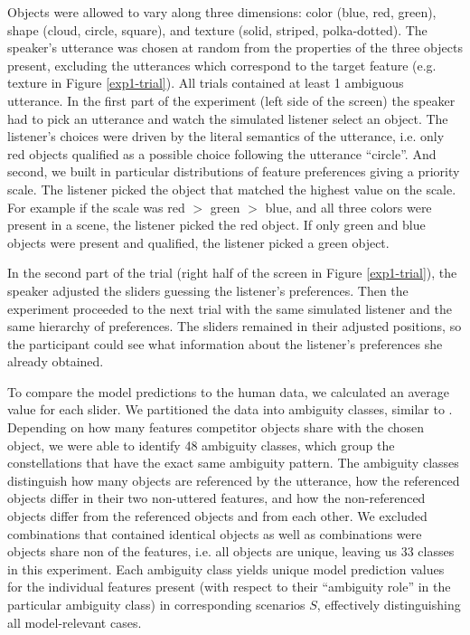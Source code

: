 \documentclass[10pt,a4paper]{article}
\begin{document}
Objects were allowed to vary along three dimensions: color (blue, red, green), shape (cloud, circle, square), and texture (solid, striped, polka-dotted). The speaker's utterance was chosen at random from the properties of the three objects present, excluding the utterances which correspond to the target feature (e.g. texture in Figure \ref{exp1-trial}).  All trials contained at least 1 ambiguous utterance. 
In the first part of the experiment (left side of the screen) the speaker had to pick an utterance and watch the simulated listener select an object. The listener's choices were driven by the literal semantics of the utterance, i.e. only red objects qualified as a possible choice following the utterance ``circle''. And second, we built in particular distributions of feature preferences giving a priority scale. The listener picked the object that matched the highest value on the scale. For example if the scale was red $>$ green $>$ blue, and all three colors were present in a scene, the listener picked the red object. If only green and blue objects were present and qualified, the listener picked a green object.

In the second part of the trial (right half of the screen in Figure \ref{exp1-trial}), the speaker adjusted the sliders guessing the listener's preferences. Then the experiment proceeded to the next trial with the same simulated listener and the same hierarchy of preferences. The sliders remained in their adjusted positions, so the participant could see what information about the listener's preferences she already obtained.


To compare the model predictions to the human data, we calculated an average value for each slider.
We partitioned the data into ambiguity classes, similar to . Depending on how many features competitor objects share with the chosen object, we were able to identify 48 ambiguity classes, which group the constellations that have the exact same ambiguity pattern. The ambiguity classes distinguish how many objects are referenced by the utterance, how the referenced objects differ in their two non-uttered features, and how the non-referenced objects differ from the referenced objects and from each other. We excluded combinations that contained identical objects as well as combinations were objects share non of the features, i.e. all objects are unique, leaving us 33 classes in this experiment. Each ambiguity class yields unique model prediction values for the individual features present (with respect to their ``ambiguity role'' in the particular ambiguity class) in corresponding scenarios $S$, effectively distinguishing all model-relevant cases.
\end{document}
